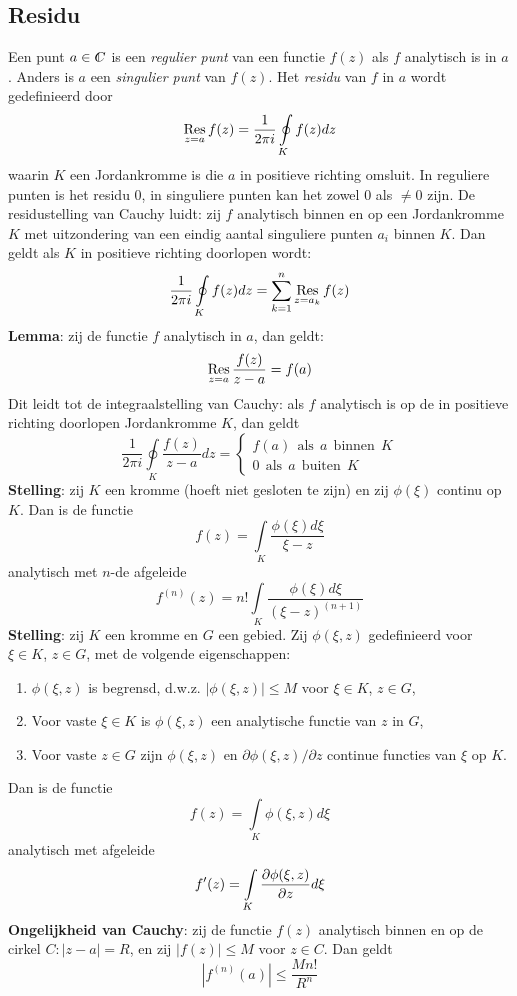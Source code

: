 \documentclass[twoside]{report}
\begin{document}
\subsection{Residu}
Een punt $a\in\CC$ is een {\it regulier punt} van een functie $f(z)$ als $f$
analytisch is in $a$. Anders is $a$ een {\it singulier punt} van $f(z)$. Het
{\it residu} van $f$ in $a$ wordt gedefinieerd door
\[
\mathop{\rm Res}\limits_{z=a}f(z)=\frac{1}{2\pi i}\oint\limits_Kf(z)dz
\]
waarin $K$ een Jordankromme is die $a$ in positieve richting omsluit. In
reguliere punten is het residu 0, in singuliere punten kan het zowel 0 als
$\neq0$ zijn. De residustelling van Cauchy luidt: zij $f$ analytisch binnen en
op een Jordankromme $K$ met uitzondering van een eindig aantal singuliere
punten $a_i$ binnen $K$. Dan geldt als $K$ in positieve richting doorlopen
wordt:
\[
\frac{1}{2\pi i}\oint\limits_Kf(z)dz=\sum_{k=1}^n\mathop{\rm Res}\limits_{z=a_k}f(z)
\]
{\bf Lemma}: zij de functie $f$ analytisch in $a$, dan geldt:
\[
\mathop{\rm Res}\limits_{z=a}\frac{f(z)}{z-a}=f(a)
\]
Dit leidt tot de integraalstelling van Cauchy: als $f$ analytisch is op de in
positieve richting doorlopen Jordankromme $K$, dan geldt
\[
\frac{1}{2\pi i}\oint\limits_K\frac{f(z)}{z-a}dz=\left\{\begin{array}{l}
f(a)~~\mbox{als}~~a~~\mbox{binnen}~~K\\
0~~\mbox{als}~~a~~\mbox{buiten}~~K
\end{array}\right.
\]
{\bf Stelling}: zij $K$ een kromme (hoeft niet gesloten te zijn) en zij
$\phi(\xi)$ continu op $K$. Dan is de functie
\[
f(z)=\int\limits_K\frac{\phi(\xi)d\xi}{\xi-z}
\]
analytisch met $n$-de afgeleide
\[
f^{(n)}(z)=n!\int\limits_K\frac{\phi(\xi)d\xi}{(\xi-z)^{(n+1)}}
\]
{\bf Stelling}: zij $K$ een kromme en $G$ een gebied. Zij $\phi(\xi,z)$
gedefinieerd voor $\xi\in K$, $z\in G$, met de volgende eigenschappen:
\begin{enumerate}
\item $\phi(\xi,z)$ is begrensd, d.w.z. $|\phi(\xi,z)|\leq M$ voor $\xi\in K$, $z\in G$,
\item Voor vaste $\xi\in K$ is $\phi(\xi,z)$ een analytische functie van $z$ in $G$,
\item Voor vaste $z\in G$ zijn $\phi(\xi,z)$ en $\partial\phi(\xi,z)/\partial z$
      continue functies van $\xi$ op $K$.
\end{enumerate}
Dan is de functie
\[
f(z)=\int\limits_K\phi(\xi,z)d\xi
\]
analytisch met afgeleide
\[
f'(z)=\int\limits_K\frac{\partial \phi(\xi,z)}{\partial z}d\xi
\]
{\bf Ongelijkheid van Cauchy}: zij de functie $f(z)$ analytisch binnen en op de
cirkel $C:|z-a|=R$, en zij $|f(z)|\leq M$ voor $z\in C$. Dan geldt
\[
\left|f^{(n)}(a)\right|\leq\frac{Mn!}{R^n}
\]
\end{document}
